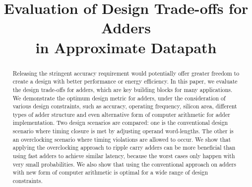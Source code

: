\documentclass[10pt, conference, compsocconf]{IEEEtran}
\begin{document}
\title{Evaluation of Design Trade-offs for Adders\\ in Approximate Datapath}

\author{
\vspace{2ex}
}


\maketitle


\begin{abstract}
Releasing the stringent accuracy requirement would potentially offer greater freedom to create a design with better performance or energy efficiency. In this paper, we evaluate the design trade-offs for adders, which are key building blocks for many applications. We demonstrate the optimum design metric for adders, under the consideration of various design constraints, such as accuracy, operating frequency, silicon area, different types of adder structure and even alternative form of computer arithmetic for adder implementation. Two design scenarios are compared: one is the conventional design scenario where timing closure is met by adjusting operand word-lengths. The other is an overclocking scenario where timing violations are allowed to occur. We show that applying the overclocking approach to ripple carry adders can be more beneficial than using fast adders to achieve similar latency, because the worst cases only happen with very small probabilities. We also show that using the conventional approach on adders with new form of computer arithmetic is optimal for a wide range of design constraints. 



\end{abstract}
\end{document}
